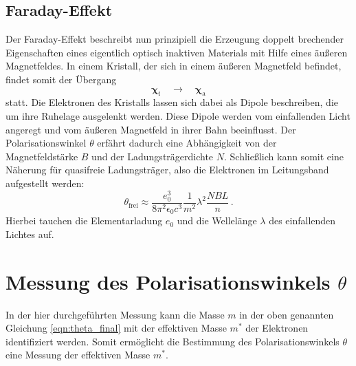 \subsection{Faraday-Effekt} %
\label{sub:faraday_effekt}
Der Faraday-Effekt beschreibt nun prinzipiell die Erzeugung doppelt brechender
Eigenschaften eines eigentlich optisch inaktiven Materials mit Hilfe eines
äußeren Magnetfeldes.
In einem Kristall, der sich in einem äußeren Magnetfeld befindet,
findet somit der Übergang
\begin{equation}
\label{eq:inaktiv_to_aktiv}
    \mathbf{\chi}_\text{i} \quad \to \quad \mathbf{\chi}_\text{a}
\end{equation}
statt.
Die Elektronen des Kristalls lassen sich dabei als Dipole beschreiben,
die um ihre Ruhelage ausgelenkt werden.
Diese Dipole werden vom einfallenden Licht angeregt und vom äußeren Magnetfeld
in ihrer Bahn beeinflusst.
%
Der Polarisationswinkel $\theta$ erfährt dadurch eine Abhängigkeit
von der Magnetfeldstärke $B$ und der Ladungsträgerdichte $N$.
Schließlich kann somit eine Näherung für quasifreie Ladungsträger,
also die Elektronen im Leitungsband aufgestellt werden:
\begin{equation}
    \label{eqn:theta_final}
    \theta_\text{frei}
    \approx \frac{e_0^3}{8\pi^2\epsilon_0 c^3}
    \frac{1}{m^2}\lambda^2 \frac{NBL}{n}\,.
\end{equation}
Hierbei tauchen die Elementarladung $e_0$ und die Wellelänge $\lambda$ des
einfallenden Lichtes auf.

\clearpage
\section{Messung des Polarisationswinkels $\theta$} %
\label{sec:messung}
In der hier durchgeführten Messung kann die Masse $m$ in der oben genannten
Gleichung \eqref{eqn:theta_final} mit der effektiven Masse $m^*$ der
Elektronen identifiziert werden.
Somit ermöglicht die Bestimmung des Polarisationswinkels $\theta$ eine Messung
der effektiven Masse $m^*$.

